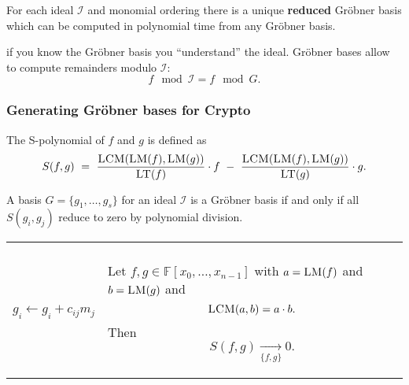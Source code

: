 \documentclass[10pt]{beamer}
\renewcommand{\emph}[1]{{\bf #1}}
\newcommand{\field}[1]{\mathbb{#1}}
\newcommand{\F}{\field{F}}
\newcommand{\LT}[1]{\ensuremath{\textsc{LT}(#1)\xspace}}
\newcommand{\LM}[1]{\ensuremath{\textsc{LM}(#1)\xspace}}
\newcommand{\LCM}[1]{\ensuremath{\textsc{LCM}(#1)\xspace}}
\newcommand{\sample}{{\;{{\leftarrow}_\$}\;}}
\newcommand{\I}{\ensuremath{\mathcal{I}}\xspace}
\renewcommand{\emph}[1]{\textbf{#1}}
\begin{document}
\begin{frame}[allowframebreaks]
\framebreak

For each ideal $\I$ and monomial ordering there is a unique \emph{reduced} Gröbner basis which can be computed in polynomial time from any Gröbner basis.

\vspace{0.5em}

\begin{block}{if you know the Gröbner basis you ``understand'' the ideal.}
Gröbner bases allow to compute remainders modulo $\I$: $$f\mod \I = f \mod G.$$
\end{block}

\end{frame}

\begin{frame}[allowframebreaks]
\frametitle{Generating Gröbner bases for Crypto}

\begin{definition}[S-Polynomial]
\label{def:spolynomials}
The S-polynomial of $f$ and $g$ is defined as
\[
S(f,g)\ =\ \frac{\LCM{\LM{f},\LM{g}}}{\LT{f}}\cdot f\ -\ \frac{\LCM{\LM{f},\LM{g}}}{\LT{g}}\cdot g.
\]
\end{definition}

\begin{theorem}
\label{thm:groebnerreducestozero}
A basis $G = \{g_1 ,\dots , g_s \}$ for an ideal $\I$ is a Gröbner basis if and only if all $S(g_i,g_j)$
reduce to zero by polynomial division.
\end{theorem}

\framebreak

\begin{tabular}{ll}
\begin{minipage}{0.4\textwidth}
\begin{algorithm}[H]
\Begin{
  \For{$0 \leq i < n$}{
        \eIf{$i > n - \ell - 1$}{$g_i \gets  x_i^d$\;}{ $g_i \gets  x_i$\;}
        \For{$m_j  \in M_{<\LM{g_i}}$}{
          $c_{ij} \sample \F_q;$ \\   $g_i \gets g_i + c_{ij}m_j$\;
    }
  }
  \Return{$\{g_0,\ldots,g_{n-1}\}$}\;
}
\label{alg.gbgen}
\end{algorithm}
\end{minipage}
&
\begin{minipage}{0.5\textwidth}
\begin{theorem}
Let $f,g \in \F[x_0,\dots,x_{n-1}]$ with $a=\LM{f}$ and $b=\LM{g}$ and $$\LCM{a,b} = a \cdot b.$$ Then $$S(f,g) \underset{\{f,g\}}{\longrightarrow} 0.$$
\label{def:buchberger_first_criterion}
\end{theorem}
\end{minipage}\\
\end{tabular}
\end{frame}
\end{document}
